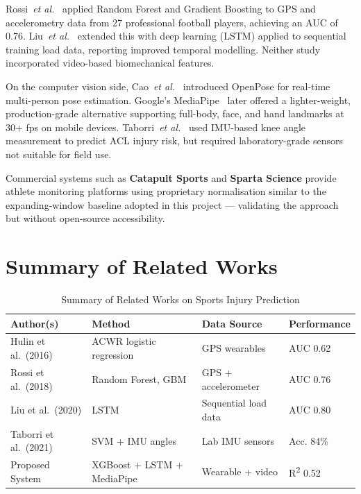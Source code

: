\documentclass[12pt,a4paper]{report}
\begin{document}
\par
Rossi~\textit{et al.}~\cite{rossi2018} applied Random Forest and Gradient Boosting to GPS and accelerometry data from 27 professional football players, achieving an AUC of 0.76. Liu~\textit{et al.}~\cite{liu2020} extended this with deep learning (LSTM) applied to sequential training load data, reporting improved temporal modelling. Neither study incorporated video-based biomechanical features.

\par
On the computer vision side, Cao~\textit{et al.}~\cite{cao2019} introduced OpenPose for real-time multi-person pose estimation. Google's MediaPipe~\cite{lugaresi2019} later offered a lighter-weight, production-grade alternative supporting full-body, face, and hand landmarks at 30+ fps on mobile devices. Taborri~\textit{et al.}~\cite{taborri2021} used IMU-based knee angle measurement to predict ACL injury risk, but required laboratory-grade sensors not suitable for field use.

\par
Commercial systems such as \textbf{Catapult Sports} and \textbf{Sparta Science} provide athlete monitoring platforms using proprietary normalisation similar to the expanding-window baseline adopted in this project — validating the approach but without open-source accessibility.

\section{Summary of Related Works}

\begin{table}[h!]
  \centering
  \caption{Summary of Related Works on Sports Injury Prediction}
  \label{tab:litreview}
  \vspace*{5pt}
  \begin{tabular}{|p{3cm}|p{3.2cm}|p{3cm}|p{3cm}|}
    \hline
    \textbf{Author(s)} & \textbf{Method} & \textbf{Data Source} & \textbf{Performance} \\ \hline
    Hulin et al.\ (2016)   & ACWR logistic regression & GPS wearables      & AUC 0.62 \\ \hline
    Rossi et al.\ (2018)   & Random Forest, GBM       & GPS + accelerometer & AUC 0.76 \\ \hline
    Liu et al.\ (2020)     & LSTM                     & Sequential load data & AUC 0.80 \\ \hline
    Taborri et al.\ (2021) & SVM + IMU angles         & Lab IMU sensors     & Acc. 84\% \\ \hline
    Proposed System        & XGBoost + LSTM + MediaPipe & Wearable + video  & R\textsuperscript{2} 0.52 \\ \hline
  \end{tabular}
\end{table}
\end{document}
